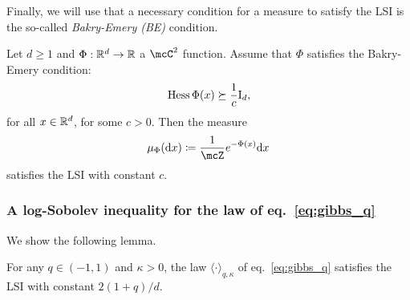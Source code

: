 \myskip
Finally, we will use that a necessary condition for a measure to satisfy the LSI is the so-called \emph{Bakry-Emery (BE)} condition.
\begin{theorem}\label{thm:be_implies_lsi}
    Let $d \geq 1$ and $\Phi : \mathbb{R}^d \to \mathbb{R}$ a $\mcC^2$ function. 
    Assume that $\Phi$ satisfies the Bakry-Emery condition:
    \begin{equation*}
         {\rm Hess} \, \Phi (x) \succeq \frac{1}{c} \mathrm{I}_d,
    \end{equation*}
    for all $x \in \mathbb{R}^d$, for some $c > 0$. 
    Then the measure
    \begin{equation*}
        \mu_\Phi(\rd x) \coloneqq \frac{1}{\mcZ} e^{-\Phi(x)} \rd x
    \end{equation*}
    satisfies the LSI with constant $c$.
\end{theorem}

\subsubsection{\texorpdfstring{A log-Sobolev inequality for the law of eq.~\eqref{eq:gibbs_q}}{}}\label{subsubsec:lsi_Pqkappa}

We show the following lemma.
\begin{lemma}\label{lemma:lsi_Pqkappa}
   For any $q \in (-1,1)$ and $\kappa > 0$,
   the law $\langle \cdot \rangle_{q,\kappa}$ of eq.~\eqref{eq:gibbs_q} satisfies the LSI with constant $2(1+q)/d$.
\end{lemma}

